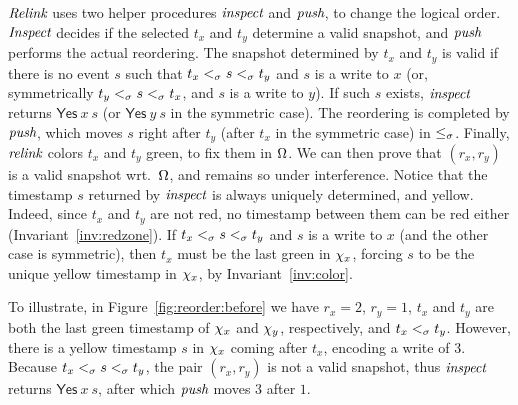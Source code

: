 $\textit{Relink}$ uses two helper procedures $\textit{inspect}$ and
$\textit{push}$, to change the logical order. $\textit{Inspect}$ decides if
the selected $t_x$ and $t_y$ determine a valid snapshot, and
$\textit{push}$ performs the actual reordering. The snapshot determined
by $t_x$ and $t_y$ is valid if there is no event $s$ such that
$t_x \mathrel{<_\sigma} s \mathrel{<_\sigma} t_y$ and $s$ is a write to $x$ (or, symmetrically
$t_y \mathrel{<_\sigma} s \mathrel{<_\sigma} t_x$, and $s$ is a write to $y$). If such $s$ exists,
$\textit{inspect}$ returns $\mathsf{Yes}\ x\ s$ (or $\mathsf{Yes}\ y\ s$
in the symmetric case). The reordering is completed by $\textit{push}$,
which moves $s$ right after $t_y$ (after $t_x$ in the symmetric case)
in $\mathrel{\leq_\sigma}$. Finally, $\textit{relink}$ colors $t_x$ and $t_y$ green, to
fix them in $\Omega$. We can then prove that $(r_x, r_y)$ is a
valid snapshot wrt.~$\Omega$, and remains so under interference.
%
Notice that the timestamp $s$ returned by $\textit{inspect}$ is always
uniquely determined, and yellow. Indeed, since $t_x$ and $t_y$ are not
red, no timestamp between them can be red either
(Invariant~\ref{inv:redzone}). If $t_x \mathrel{<_\sigma} s \mathrel{<_\sigma} t_y$ and $s$ is a
write to $x$ (and the other case is symmetric), then $t_x$ must be the
last green in $\chi_x$, forcing $s$ to be the unique yellow timestamp
in $\chi_x$, by Invariant~\ref{inv:color}.


To illustrate, in Figure~\ref{fig:reorder:before} we have $r_x = 2$,
$r_y = 1$, $t_x$ and $t_y$ are both the last green timestamp of
$\chi_x$ and $\chi_y$, respectively, and $t_x \mathrel{<_\sigma} t_y$. However,
there is a yellow timestamp $s$ in $\chi_x$ coming after $t_x$,
encoding a write of $3$. Because $t_x \mathrel{<_\sigma} s \mathrel{<_\sigma} t_y$, the pair
$(r_x, r_y)$ is not a valid snapshot, thus $\textit{inspect}$ returns
$\mathsf{Yes}\ x\ s$, after which $\textit{push}$ moves $3$ after $1$.

%

